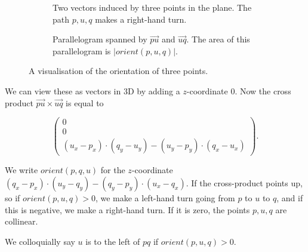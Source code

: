 \begin{figure}[ht]
    \begin{subfigure}{0.45\textwidth}
    \caption{Two vectors induced by three points in the plane. The path 
             $p, u, q$ makes a right-hand turn.}
    \label{fig:orient1}
    \end{subfigure}\hfill
    \begin{subfigure}{0.45\textwidth}
    \caption{Parallelogram spanned by $\vec{pu}$ and $\vec{uq}$. 
             The area of this parallelogram is $|orient(p, u, q)|$.}
    \label{fig:orient2}
    \end{subfigure}
    \caption{A visualisation of the orientation of three points.}
\end{figure}

We can view these as vectors in 3D by adding a $z$-coordinate $0$. Now the
cross product $\vec{pu} \times \vec{uq}$ is equal to 

\[
    \begin{pmatrix}
        0 \\
        0 \\
        (u_x - p_x) \cdot (q_y - u_y) - (u_y - p_y) \cdot (q_x - u_x)
    \end{pmatrix}.
\]

We write $orient(p, q, u)$ for the $z$-coordinate
$(q_x - p_x) \cdot (u_y - q_y) - (q_y - p_y) \cdot (u_x - q_x)$. 
If the cross-product points up, so if $orient(p, u, q) > 0$, we make a left-hand 
turn going from $p$ to $u$ to $q$, and if this is negative, we make a right-hand
turn. If it is zero, the points $p, u, q$ are collinear. 

We colloquially say $u$ is to the left of $pq$ if $orient(p, u, q) > 0$.

